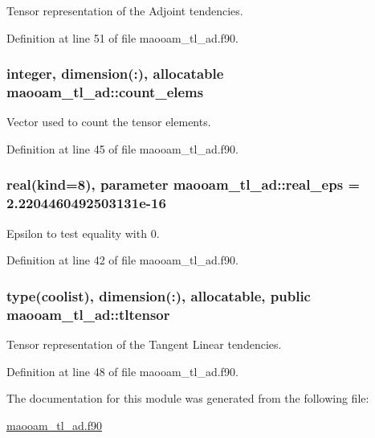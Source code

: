 Tensor representation of the Adjoint tendencies. 



Definition at line 51 of file maooam\-\_\-tl\-\_\-ad.\-f90.

\hypertarget{classmaooam__tl__ad_a99e3afa56cd46b38c6420a6e11f8b295}{
\subsubsection[{count\-\_\-elems}]{\setlength{\rightskip}{0pt plus 5cm}integer, dimension(\-:), allocatable maooam\-\_\-tl\-\_\-ad\-::count\-\_\-elems\hspace{0.3cm}{\ttfamily [private]}}}\label{classmaooam__tl__ad_a99e3afa56cd46b38c6420a6e11f8b295}


Vector used to count the tensor elements. 



Definition at line 45 of file maooam\-\_\-tl\-\_\-ad.\-f90.

\hypertarget{classmaooam__tl__ad_a72b14cc94dc63d2edc24926298820c5c}{
\subsubsection[{real\-\_\-eps}]{\setlength{\rightskip}{0pt plus 5cm}real(kind=8), parameter maooam\-\_\-tl\-\_\-ad\-::real\-\_\-eps = 2.\-2204460492503131e-\/16\hspace{0.3cm}{\ttfamily [private]}}}\label{classmaooam__tl__ad_a72b14cc94dc63d2edc24926298820c5c}


Epsilon to test equality with 0. 



Definition at line 42 of file maooam\-\_\-tl\-\_\-ad.\-f90.

\hypertarget{classmaooam__tl__ad_a44e20f0d2365c0a256682dbf12c100c8}{
\subsubsection[{tltensor}]{\setlength{\rightskip}{0pt plus 5cm}type(coolist), dimension(\-:), allocatable, public maooam\-\_\-tl\-\_\-ad\-::tltensor}}\label{classmaooam__tl__ad_a44e20f0d2365c0a256682dbf12c100c8}


Tensor representation of the Tangent Linear tendencies. 



Definition at line 48 of file maooam\-\_\-tl\-\_\-ad.\-f90.



The documentation for this module was generated from the following file\-:\begin{DoxyCompactItemize}
\item 
\hyperlink{maooam__tl__ad_8f90}{maooam\-\_\-tl\-\_\-ad.\-f90}\end{DoxyCompactItemize}
